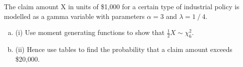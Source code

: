 \documentclass[a4paper,12pt]{article}
\begin{document}
The claim amount X in units of \$1,000 for a certain type of industrial policy is modelled as a gamma variable with parameters $\alpha = 3$ and $\lambda = 1⁄4$.

\begin{enumerate}[(a)]
    \item (i) Use moment generating functions to show that $\frac{1}{2}X \sim \chi^{2}_{6}$.
\item (ii) Hence use tables to find the probability that a claim amount exceeds \$20,000.
\end{enumerate}



\end{document}
